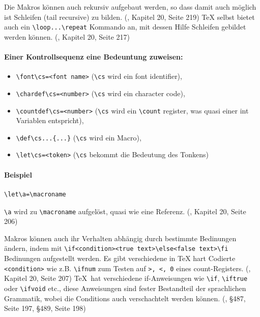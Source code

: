 Die Makros können auch rekursiv aufgebaut werden, so dass damit auch möglich ist
Schleifen (tail recursive) zu bilden.
(\cite{tex-a}, Kapitel 20, Seite 219)
TeX selbst bietet auch ein \lstinline|\loop...\repeat| Kommando an,
mit dessen Hilfe Schleifen gebildet werden können.
(\cite{tex-a}, Kapitel 20, Seite 217)


\paragraph{Einer Kontrollsequenz eine Bedeuntung zuweisen:}

\begin{itemize}
  \item \lstinline|\font\cs=<font name>|
        (\lstinline|\cs| wird ein font identifier),
  \item \lstinline|\chardef\cs=<number>|
        (\lstinline|\cs| wird ein character code),
  \item \lstinline|\countdef\cs=<number>|
        (\lstinline|\cs| wird ein \lstinline|\count| register,
        was quasi einer int Variablen entspricht),
  \item \lstinline|\def\cs...{...}|
        (\lstinline|\cs| wird ein Macro),
  \item \lstinline|\let\cs=<token>|
        (\lstinline|\cs| bekommt die Bedeutung des Tonkens)
\end{itemize}

\paragraph{Beispiel}

\begin{verbatim}
\let\a=\macroname
\end{verbatim}

\lstinline|\a| wird zu \lstinline|\macroname| aufgelöst, quasi wie eine Referenz.
(\cite{tex-a}, Kapitel 20, Seite 206)


Makros können auch ihr Verhalten abhängig durch bestimmte Bedinungen
ändern, indem mit \lstinline|\if<condition><true text>\else<false text>\fi|
Bedinungen
aufgestellt werden. Es gibt verschiedene in TeX hart Codierte
\lstinline|<condition>|
wie z.B. \lstinline|\ifnum| zum Testen auf \lstinline|>, <, 0| eines count-Registers.
(\cite{tex-a}, Kapitel 20, Seite 207)
\TeX ~hat verschiedene if-Anweisungen wie \lstinline|\if|, \lstinline|\iftrue| oder \lstinline|\ifvoid| etc.,
diese Anweisungen sind fester Bestandteil der sprachlichen Grammatik,
wobei die Conditions auch verschachtelt werden können.
(\cite{tex-a}, §487, Seite 197, §489, Seite 198)

